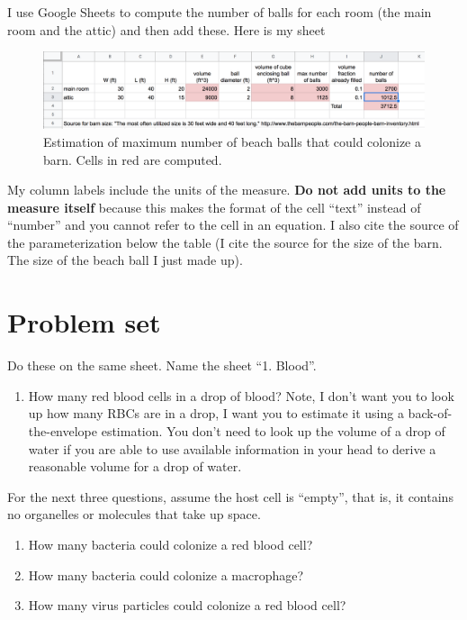 \documentclass[]{book}
\providecommand{\tightlist}{%
  \setlength{\itemsep}{0pt}\setlength{\parskip}{0pt}}
\begin{document}
I use Google Sheets to compute the number of balls for each room (the
main room and the attic) and then add these. Here is my sheet

\begin{figure}

{\centering \includegraphics[width=0.8\linewidth]{images/balls} 

}

\caption{Estimation of maximum number of beach balls that could colonize a barn. Cells in red are computed.}\label{fig:balls}
\end{figure}

My column labels include the units of the measure. \textbf{Do not add
units to the measure itself} because this makes the format of the cell
``text'' instead of ``number'' and you cannot refer to the cell in an
equation. I also cite the source of the parameterization below the table
(I cite the source for the size of the barn. The size of the beach ball
I just made up).

\section{Problem set}\label{problem-set-1}

Do these on the same sheet. Name the sheet ``1. Blood''.

\begin{enumerate}
\def\labelenumi{\arabic{enumi}.}
\tightlist
\item
  How many red blood cells in a drop of blood? Note, I don't want you to
  look up how many RBCs are in a drop, I want you to estimate it using a
  back-of-the-envelope estimation. You don't need to look up the volume
  of a drop of water if you are able to use available information in
  your head to derive a reasonable volume for a drop of water.
\end{enumerate}

For the next three questions, assume the host cell is ``empty'', that
is, it contains no organelles or molecules that take up space.

\begin{enumerate}
\def\labelenumi{\arabic{enumi}.}
\setcounter{enumi}{1}
\item
  How many bacteria could colonize a red blood cell?
\item
  How many bacteria could colonize a macrophage?
\item
  How many virus particles could colonize a red blood cell?
\end{enumerate}
\end{document}
